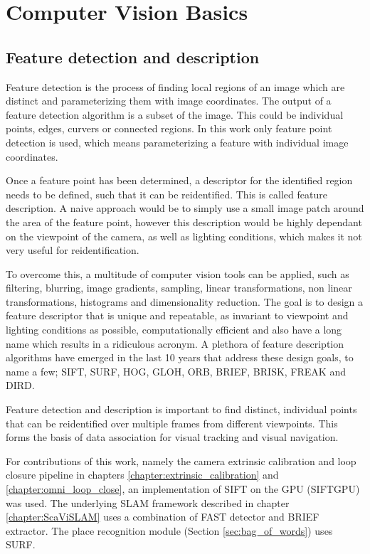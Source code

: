 \section{Computer Vision Basics}
\label{sec:computer_vision}

\subsection{Feature detection and description}
\label{subsec:features}

Feature detection is the process of finding local regions of an image which are distinct and parameterizing them with image coordinates.  The output of a feature detection algorithm is a subset of the image. This could be individual points, edges, curvers or connected regions. In this work only feature point detection is used, which means parameterizing a feature with individual image coordinates.

Once a feature point has been determined, a descriptor for the identified region needs to be defined, such that it can be reidentified.  This is called feature description.  A naive approach would be to simply use a small image patch around the area of the feature point, however this description would be highly dependant on the viewpoint of the camera, as well as lighting conditions, which makes it not very useful for reidentification.

To overcome this, a multitude of computer vision tools can be applied, such as filtering, blurring, image gradients, sampling, linear transformations, non linear transformations, histograms and dimensionality reduction.  The goal is to design a feature descriptor that is unique and repeatable, as invariant to viewpoint and lighting conditions as possible, computationally efficient and also have a long name which results in a ridiculous acronym.  A plethora of feature description algorithms have emerged in the last 10 years that address these design goals, to name a few; SIFT, SURF, HOG, GLOH, ORB, BRIEF, BRISK, FREAK and DIRD.

Feature detection and description is important to find distinct, individual points that can be reidentified over multiple frames from different viewpoints.  This forms the basis of data association for visual tracking and visual navigation.

For contributions of this work, namely the camera extrinsic calibration and loop closure pipeline in chapters \ref{chapter:extrinsic_calibration} and \ref{chapter:omni_loop_close}, an implementation of SIFT on the GPU (SIFTGPU) was used.  The underlying SLAM framework described in chapter \ref{chapter:ScaViSLAM} uses a combination of FAST detector and BRIEF extractor.  The place recognition module (Section \ref{sec:bag_of_words}) uses SURF.

